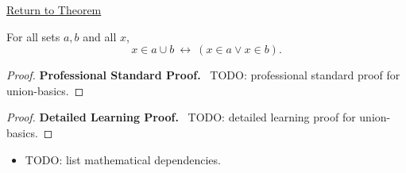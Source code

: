 \newpage
{}
\label{prf:union-basics}

\begin{remark*}[Return]
\hyperref[prop:union-basics]{Return to Theorem}
\end{remark*}

\begin{theorem*}
For all sets $a,b$ and all $x$,
\[
x\in a\cup b\ \leftrightarrow\ (x\in a \lor x\in b).
\]
\end{theorem*}

\begin{proof}
\textbf{Professional Standard Proof.}~
TODO: professional standard proof for union-basics.
\end{proof}

\begin{proof}
\textbf{Detailed Learning Proof.}~
TODO: detailed learning proof for union-basics.
\end{proof}

\begin{remark*}
\end{remark*}

\begin{dependencies}
\begin{itemize}
  \item TODO: list mathematical dependencies.
\end{itemize}
\end{dependencies}

\clearpage

